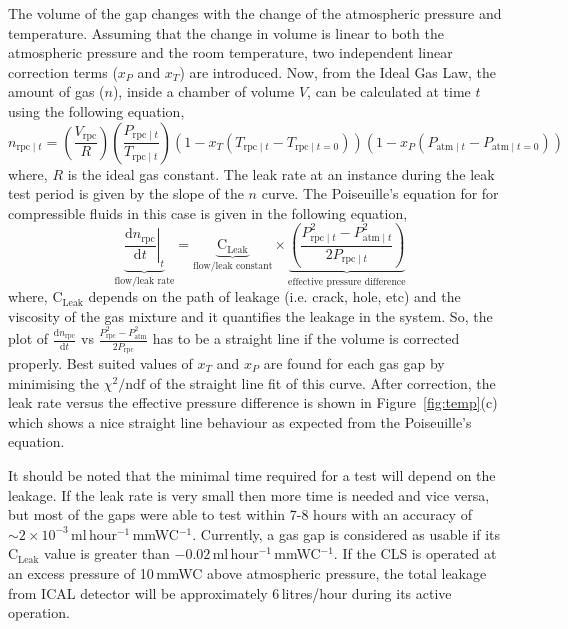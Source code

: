 \documentclass[a4paper,12pt,twoside,openany]{article}
\begin{document}
The volume of the gap changes with the change of the atmospheric pressure and temperature. Assuming that the change in volume is linear to both the atmospheric pressure and the room temperature, two independent linear correction terms ($x_P$ and $x_T$) are introduced. Now, from the Ideal Gas Law, the amount of gas ($n$), inside a chamber of volume $V$, can be calculated at time $t$ using the following equation,
\begin{equation}
  n_{\textrm{rpc}\mid t}=\left(\frac{V_{\textrm{rpc}}}{R}\right)\left(\frac{P_{\textrm{rpc}\mid t}}{T_{\textrm{rpc}\mid t}}\right)\left(1-x_T\left(T_{\textrm{rpc}\mid t}-T_{\textrm{rpc}\mid t=0}\right)\right)\left(1-x_P\left(P_{\textrm{atm}\mid t}-P_{\textrm{atm}\mid t=0}\right)\right) \label{eq:ct}
\end{equation}
where, $R$ is the ideal gas constant. The leak rate at an instance during the leak test period is given by the slope of the $n$ curve. The Poiseuille's equation\cite{poiseuille} for for compressible fluids in this case is given in the following equation,
\begin{equation}
  \underbrace{\left.\frac{\mathrm{d}n_{\textrm{rpc}}}{\mathrm{d}t}\right| _t}_\text{flow/leak rate}=\underbrace{\textrm{C}_{\textrm{Leak}}}_\text{flow/leak constant}\times\underbrace{\left(\frac {P_{{\textrm{rpc}\mid t} }^{2}-P_{{\textrm{atm}\mid t} }^{2}}{2P_{{\textrm{rpc}\mid t} }}\right)}_\text{effective pressure difference}\label{eq:poiseuille}
\end{equation}
where, $\textrm{C}_{\textrm{Leak}}$ depends on the path of leakage (i.e. crack, hole, etc) and the viscosity of the gas mixture and it quantifies the leakage in the system. So, the plot of $\frac{\mathrm{d}n_{\textrm{rpc}}}{\mathrm{d}t}$ vs $\frac{P_{\textrm{rpc}}^{2}-P_{\textrm{atm}}^{2}}{2P_{\textrm{rpc}}}$ has to be a straight line if the volume is corrected properly. Best suited values of $x_T$ and $x_P$ are found for each gas gap by minimising the $\chi^2/\textrm{ndf}$ of the straight line fit of this curve. After correction, the leak rate versus the effective pressure difference is shown in Figure~\ref{fig:temp}(c) which shows a nice straight line behaviour as expected from the Poiseuille's equation. 

It should be noted that the minimal time required for a test will depend on the leakage. If the leak rate is very small then more time is needed and vice versa, but most of the gaps were able to test within 7-8 hours with an accuracy of $\sim 2\times 10^{-3}$\,ml\,hour$^{-1}$\,mmWC$^{-1}$.  Currently, a gas gap is considered as usable if its $\textrm{C}_{\textrm{Leak}}$ value is greater than $-0.02$\,ml\,hour$^{-1}$\,mmWC$^{-1}$. If the CLS is operated at an excess pressure of 10\,mmWC above atmospheric pressure, the total leakage from ICAL detector will be approximately 6\,litres/hour during its active operation.
\end{document}
